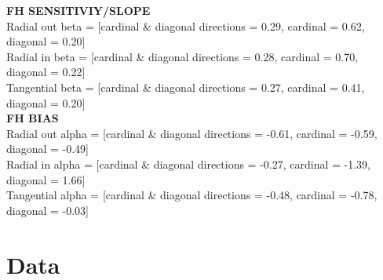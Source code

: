 \documentclass[11pt]{article} %
\begin{document}
\textbf{FH SENSITIVIY/SLOPE}
\\
Radial out beta = [cardinal \& diagonal directions =  0.29, cardinal = 0.62, diagonal = 0.20]
\\
Radial in beta = [cardinal \& diagonal directions =  0.28, cardinal = 0.70, diagonal = 0.22]
\\
Tangential beta = [cardinal \& diagonal directions =  0.27, cardinal = 0.41, diagonal = 0.20]
\\
\textbf{FH BIAS}
\\
Radial out alpha = [cardinal \& diagonal directions =  -0.61, cardinal = -0.59, diagonal = -0.49]
\\
Radial in alpha = [cardinal \& diagonal directions =  -0.27, cardinal = -1.39, diagonal = 1.66]
\\
Tangential alpha = [cardinal \& diagonal directions =  -0.48, cardinal = -0.78, diagonal = -0.03]

\newpage
\section{Data}
\end{document}
